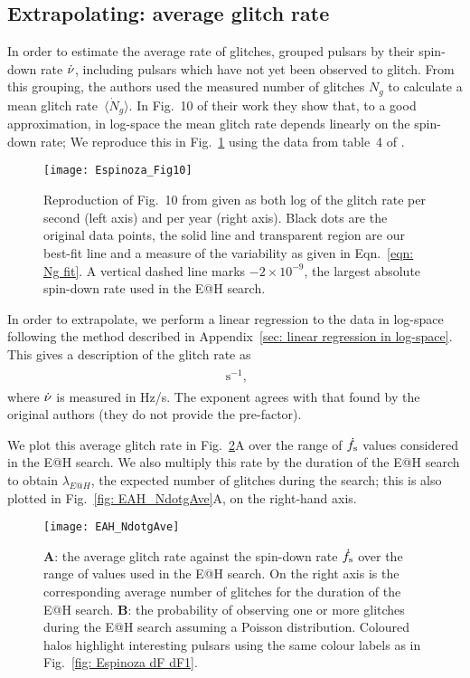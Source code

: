 \documentclass[../full_thesis/full_thesis.tex]{subfiles}
\newcommand{\thisdir}{../glitches_in_CGW}
\begin{document}
\subsection{Extrapolating: average glitch rate}
\label{sec: average glitch frequency}
In order to estimate the average rate of glitches, \citet{Espinoza2011}
grouped pulsars by their spin-down rate $\dot{\nu}$, including pulsars
which have not yet been observed to glitch. From this grouping, the authors
used the measured number of glitches $N_{g}$ to calculate a mean
glitch rate~$\langle \dot{N}_{g}\rangle$. In Fig.~10 of their work they
show that, to a good approximation, in log-space the mean glitch rate depends linearly on the spin-down rate;
We reproduce this in Fig.~\ref{fig: Espinoza 10} using the data from table~4
of \citet{Espinoza2011}.
\begin{figure}[htb]
\centering
\texttt{[image: Espinoza\_Fig10]}
\caption{Reproduction of Fig.~10 from \citet{Espinoza2011} given as both log of
the glitch rate per second (left axis) and per year (right axis). Black
dots are the original data points, the solid line and transparent region are
our best-fit line and a measure of the variability as given in Eqn.~\eqref{eqn:
Ng fit}. A vertical dashed line marks $-2\times10^{-9}$, the largest absolute
spin-down rate used in the E@H search.}
\label{fig: Espinoza 10}
\end{figure}

In order to extrapolate, we perform a linear regression to the data in
log-space following the method described in Appendix~\ref{sec: linear
regression in log-space}.  This gives a description of the glitch rate as
\begin{align}
\begin{split}

\textrm{ s}^{-1},
\end{split}
\label{eqn: Ng fit}
\end{align}
where $\dot{\nu}$ is measured in Hz/s.  The exponent agrees with that found by
the original authors (they do not provide the pre-factor).

We plot this average glitch rate in Fig.~\ref{fig: EAH_NdotgAve}A over the
range of $\dot{f}_{\textrm{s}}$ values considered in the E@H search. We also multiply this
rate by the duration of the E@H search to obtain $\lambda_{E@H}$, the expected
number of glitches during the search; this is also plotted in Fig.~\ref{fig:
EAH_NdotgAve}A, on the right-hand axis.

\begin{figure}[htb]
\centering
\texttt{[image: EAH\_NdotgAve]}
\caption{\textbf{A}: the average glitch rate against the spin-down rate $\dot{f}_{\textrm{s}}$ over the
         range of values used in the E@H search. On the right axis is the corresponding
         average number of glitches for the duration of the E@H search. \textbf{B}: the
         probability of observing one or more glitches during the E@H search
         assuming a Poisson distribution. Coloured halos highlight interesting
         pulsars using the same colour labels as in
         Fig.~\ref{fig: Espinoza dF dF1}.}
\label{fig: EAH_NdotgAve}
\end{figure}
\end{document}
